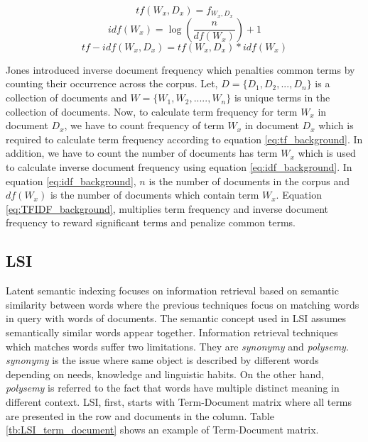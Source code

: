 \begin{equation}
    tf (W_x, D_x) = f_{W_x,D_x}
    \label{eq:tf_background}
\end{equation}
\begin{equation}
    idf(W_x) = \log(\frac{n}{df(W_x)})+1
    \label{eq:idf_background}
\end{equation}
\begin{equation}
    tf-idf(W_x, D_x) = tf(W_x,D_x) * idf(W_x)
    \label{eq:TFIDF_background}
\end{equation}


Jones \cite{jones1972statistical} introduced inverse document frequency which penalties common terms by counting their occurrence across the corpus. Let, $D = \{D_1, D_2, ..., D_n\}$ is a collection of documents and $W = \{W_1, W_2, ....., W_n\}$ is unique terms in the collection of documents. Now, to calculate term frequency for term $W_x$ in document $D_x$, we have to count frequency of term $W_x$ in  document $D_x$ which is required to calculate term frequency according to equation \ref{eq:tf_background}. In addition, we have to count the number of documents has term $W_x$ which is used to calculate inverse document frequency using equation \ref{eq:idf_background}. In equation \ref{eq:idf_background}, $n$ is the number of documents in the corpus and $df(W_x)$ is the number of documents which contain term $W_x$. Equation \ref{eq:TFIDF_background}, multiplies term frequency and inverse document frequency to reward significant terms and penalize common terms. 



\subsection{LSI}
Latent semantic indexing focuses on information retrieval based on semantic similarity between words where the previous techniques focus on matching words in query with words of documents. The semantic concept used in LSI assumes semantically similar words appear together. Information retrieval techniques which matches words suffer two limitations. They are \emph{synonymy} and \emph{polysemy}. \emph{synonymy} is the issue where same object is described by different words depending on needs, knowledge and linguistic habits. On the other hand, \emph{polysemy} is referred to the fact that words have multiple distinct meaning in different context. LSI, first, starts with Term-Document matrix where all terms are presented in the row and documents in the column. Table \ref{tb:LSI_term_document} shows an example of Term-Document matrix. 

